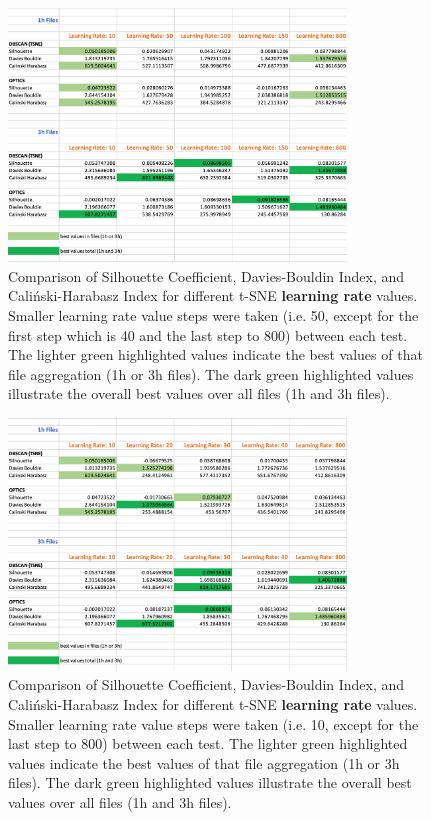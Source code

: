 \begin{figure}
  \centering
  \includegraphics[width=0.8\textwidth]{./images/tsneParametersTest/learningRate/learningRateEvaluationScoresDetailed.png}
  \caption{Comparison of Silhouette Coefficient, Davies-Bouldin Index, and Caliński-Harabasz Index for different t-SNE \textbf{learning rate} values. Smaller learning rate value steps were taken (i.e. 50, except for the first step which is 40 and the last step to 800) between each test. The lighter green highlighted values indicate the best values of that file aggregation (1h or 3h files). The dark green highlighted values illustrate the overall best values over all files (1h and 3h files).}
  \label{figure:learningRateEvaluationScoresDetailed}
\end{figure}

\begin{figure}
  \centering
  \includegraphics[width=0.8\textwidth]{./images/tsneParametersTest/learningRate/learningRateEvaluationScoresDetailed2.png}
  \caption{Comparison of Silhouette Coefficient, Davies-Bouldin Index, and Caliński-Harabasz Index for different t-SNE \textbf{learning rate} values. Smaller learning rate value steps were taken (i.e. 10, except for the last step to 800) between each test. The lighter green highlighted values indicate the best values of that file aggregation (1h or 3h files). The dark green highlighted values illustrate the overall best values over all files (1h and 3h files).}
  \label{figure:learningRateEvaluationScoresDetailed2}
\end{figure}

